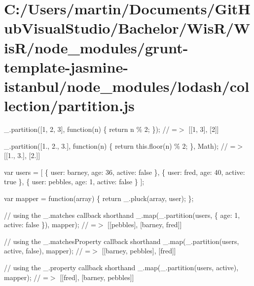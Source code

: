 \hypertarget{_c_1_2_users_2martin_2_documents_2_git_hub_visual_studio_2_bachelor_2_wis_r_2_wis_r_2node_module516d2b4c5b5f0bdf021f04c674aa41b9}{}\section{C\+:/\+Users/martin/\+Documents/\+Git\+Hub\+Visual\+Studio/\+Bachelor/\+Wis\+R/\+Wis\+R/node\+\_\+modules/grunt-\/template-\/jasmine-\/istanbul/node\+\_\+modules/lodash/collection/partition.\+js}
\+\_\+.\+partition(\mbox{[}1, 2, 3\mbox{]}, function(n) \{ return n \% 2; \}); // =$>$ \mbox{[}\mbox{[}1, 3\mbox{]}, \mbox{[}2\mbox{]}\mbox{]}

\+\_\+.\+partition(\mbox{[}1., 2., 3.\mbox{]}, function(n) \{ return this.\+floor(n) \% 2; \}, Math); // =$>$ \mbox{[}\mbox{[}1., 3.\mbox{]}, \mbox{[}2.\mbox{]}\mbox{]}

var users = \mbox{[} \{ \textquotesingle{}user\textquotesingle{}\+: \textquotesingle{}barney\textquotesingle{}, \textquotesingle{}age\textquotesingle{}\+: 36, \textquotesingle{}active\textquotesingle{}\+: false \}, \{ \textquotesingle{}user\textquotesingle{}\+: \textquotesingle{}fred\textquotesingle{}, \textquotesingle{}age\textquotesingle{}\+: 40, \textquotesingle{}active\textquotesingle{}\+: true \}, \{ \textquotesingle{}user\textquotesingle{}\+: \textquotesingle{}pebbles\textquotesingle{}, \textquotesingle{}age\textquotesingle{}\+: 1, \textquotesingle{}active\textquotesingle{}\+: false \} \mbox{]};

var mapper = function(array) \{ return \+\_\+.\+pluck(array, \textquotesingle{}user\textquotesingle{}); \};

// using the {\ttfamily \+\_\+.\+matches} callback shorthand \+\_\+.\+map(\+\_\+.\+partition(users, \{ \textquotesingle{}age\textquotesingle{}\+: 1, \textquotesingle{}active\textquotesingle{}\+: false \}), mapper); // =$>$ \mbox{[}\mbox{[}\textquotesingle{}pebbles\textquotesingle{}\mbox{]}, \mbox{[}\textquotesingle{}barney\textquotesingle{}, \textquotesingle{}fred\textquotesingle{}\mbox{]}\mbox{]}

// using the {\ttfamily \+\_\+.\+matches\+Property} callback shorthand \+\_\+.\+map(\+\_\+.\+partition(users, \textquotesingle{}active\textquotesingle{}, false), mapper); // =$>$ \mbox{[}\mbox{[}\textquotesingle{}barney\textquotesingle{}, \textquotesingle{}pebbles\textquotesingle{}\mbox{]}, \mbox{[}\textquotesingle{}fred\textquotesingle{}\mbox{]}\mbox{]}

// using the {\ttfamily \+\_\+.\+property} callback shorthand \+\_\+.\+map(\+\_\+.\+partition(users, \textquotesingle{}active\textquotesingle{}), mapper); // =$>$ \mbox{[}\mbox{[}\textquotesingle{}fred\textquotesingle{}\mbox{]}, \mbox{[}\textquotesingle{}barney\textquotesingle{}, \textquotesingle{}pebbles\textquotesingle{}\mbox{]}\mbox{]}


